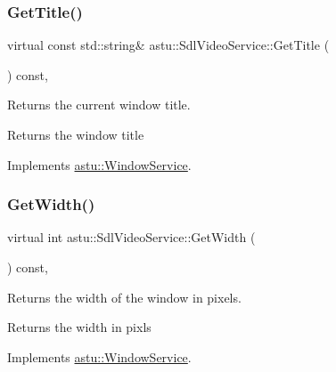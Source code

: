 \subsubsection{\texorpdfstring{Get\+Title()}{GetTitle()}}
{\footnotesize\ttfamily virtual const std\+::string\& astu\+::\+Sdl\+Video\+Service\+::\+Get\+Title (\begin{DoxyParamCaption}{ }\end{DoxyParamCaption}) const\hspace{0.3cm}{\ttfamily [override]}, {\ttfamily [virtual]}}

Returns the current window title.

\begin{DoxyReturn}{Returns}
the window title 
\end{DoxyReturn}


Implements \hyperlink{classastu_1_1WindowService_a54815692f9d3086673dd2694d75dcb65}{astu\+::\+Window\+Service}.

\mbox{\label{classastu_1_1SdlVideoService_a45c3181611e718bcfe44862baed6d520}} 
\subsubsection{\texorpdfstring{Get\+Width()}{GetWidth()}}
{\footnotesize\ttfamily virtual int astu\+::\+Sdl\+Video\+Service\+::\+Get\+Width (\begin{DoxyParamCaption}{ }\end{DoxyParamCaption}) const\hspace{0.3cm}{\ttfamily [override]}, {\ttfamily [virtual]}}

Returns the width of the window in pixels.

\begin{DoxyReturn}{Returns}
the width in pixls 
\end{DoxyReturn}


Implements \hyperlink{classastu_1_1WindowService_ad2e75e91b0d72afb92c980fcbd8f227a}{astu\+::\+Window\+Service}.

\mbox{\label{classastu_1_1SdlVideoService_ae2be9aedf021799802cf7d1feaef7dfc}} 
